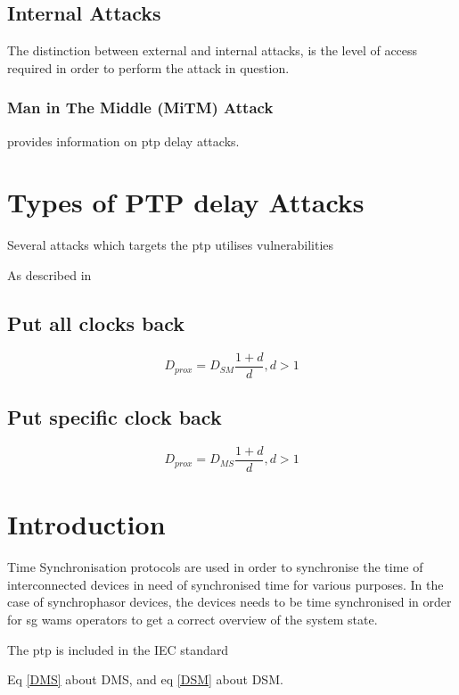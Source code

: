 \subsection{Internal Attacks}
The distinction between external and internal attacks, is the level of access required in order to perform the attack in question.

\subsubsection{Man in The Middle (MiTM) Attack}



\cite{itkin2017security} provides information on \acrshort{ptp} delay attacks.





\section{Types of PTP delay Attacks}
Several attacks which targets the \acrlong{ptp}  utilises vulnerabilities 



As described in \cite{ullmann2009delay}
\subsection{Put all clocks back}

\begin{equation} \label{DSM}
    D_{prox}=D_{SM}\frac{1+d}{d},d>1 
\end{equation}
\subsection{Put specific clock back}
\begin{equation} \label{DMS}
    D_{prox}=D_{MS}\frac{1+d}{d},d>1 
\end{equation}

\section{Introduction}
Time Synchronisation protocols are used in order to synchronise the time of interconnected devices in need of synchronised time for various purposes. In the case of synchrophasor devices, the devices needs to be time synchronised in order for \acrshort{sg} \acrshort{wams} operators to get a correct overview of the system state.



The \acrshort{ptp} is included in the IEC standard

Eq \ref{DMS} about DMS, and  eq \ref{DSM} about DSM.


